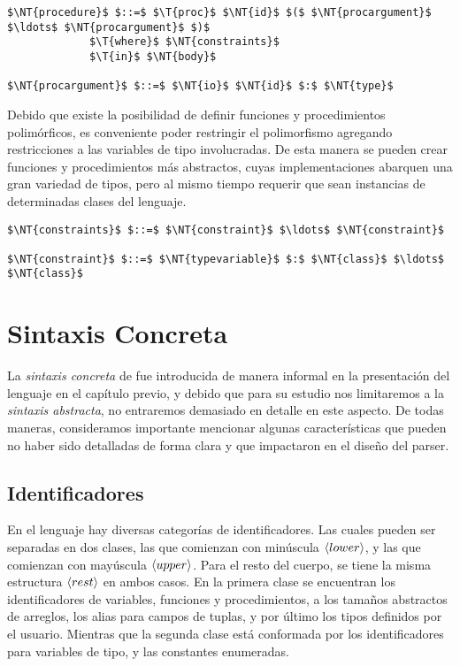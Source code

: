 \begin{lstlisting}[style = syntax]
$\NT{procedure}$ $::=$ $\T{proc}$ $\NT{id}$ $($ $\NT{procargument}$ $\ldots$ $\NT{procargument}$ $)$
             $\T{where}$ $\NT{constraints}$
             $\T{in}$ $\NT{body}$

$\NT{procargument}$ $::=$ $\NT{io}$ $\NT{id}$ $:$ $\NT{type}$
\end{lstlisting}

Debido que existe la posibilidad de definir funciones y procedimientos polimórficos, es conveniente poder restringir el polimorfismo agregando restricciones a las variables de tipo involucradas.
De esta manera se pueden crear funciones y procedimientos más abstractos, cuyas implementaciones abarquen una gran variedad de tipos, pero al mismo tiempo requerir que sean instancias de determinadas clases del lenguaje.

\begin{lstlisting}[style = syntax]
$\NT{constraints}$ $::=$ $\NT{constraint}$ $\ldots$ $\NT{constraint}$

$\NT{constraint}$ $::=$ $\NT{typevariable}$ $:$ $\NT{class}$ $\ldots$ $\NT{class}$
\end{lstlisting}

\section{Sintaxis Concreta}

La \textit{sintaxis concreta} de \Lenguaje{} fue introducida de manera informal en la presentación del lenguaje en el capítulo previo, y debido que para su estudio nos limitaremos a la \textit{sintaxis abstracta}, no entraremos demasiado en detalle en este aspecto.
De todas maneras, consideramos importante mencionar algunas características que pueden no haber sido detalladas de forma clara y que impactaron en el diseño del parser.

\subsection{Identificadores}

En el lenguaje hay diversas categorías de identificadores.
Las cuales pueden ser separadas en dos clases, las que comienzan con minúscula $\langle lower \rangle$, y las que comienzan con mayúscula $\langle upper \rangle$.
Para el resto del cuerpo, se tiene la misma estructura $\langle rest \rangle$ en ambos casos.
En la primera clase se encuentran los identificadores de variables, funciones y procedimientos, a los tamaños abstractos de arreglos, los alias para campos de tuplas, y por último los tipos definidos por el usuario.
Mientras que la segunda clase está conformada por los identificadores para variables de tipo, y las constantes enumeradas.

